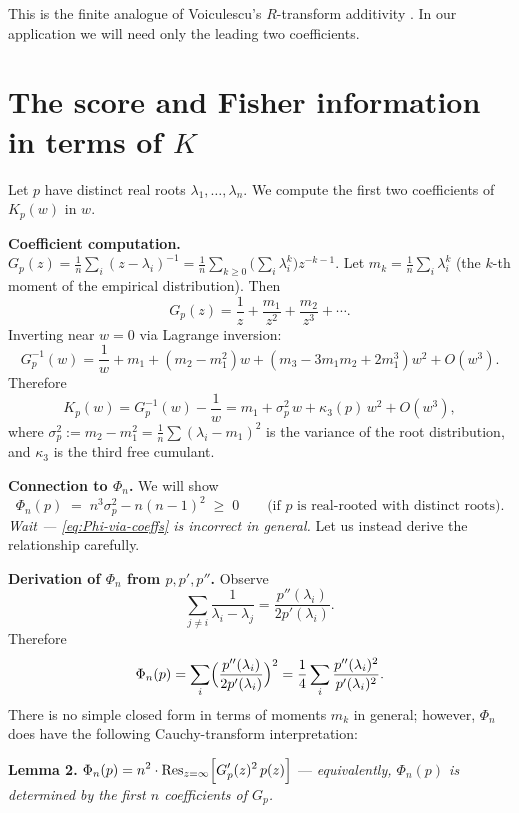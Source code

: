 This is the finite analogue of Voiculescu's $R$-transform additivity \cite{MSS22,AP18,Mar21}.  In our application we will need only the leading two coefficients.

\section*{The score and Fisher information in terms of $K$}

Let $p$ have distinct real roots $\lambda_1,\ldots,\lambda_n$.  We compute the first two coefficients of $K_p(w)$ in $w$.

\textbf{Coefficient computation.}  $G_p(z)=\frac1n\sum_i(z-\lambda_i)^{-1}=\frac1n\sum_{k\ge 0}\bigl(\sum_i\lambda_i^k\bigr)z^{-k-1}$.  Let $m_k=\frac1n\sum_i\lambda_i^k$ (the $k$-th moment of the empirical distribution).  Then
\[
G_p(z)=\frac{1}{z}+\frac{m_1}{z^2}+\frac{m_2}{z^3}+\cdots.
\]
Inverting near $w=0$ via Lagrange inversion:
\[
G_p^{-1}(w)=\frac1w+m_1+(m_2-m_1^2)w+(m_3-3m_1m_2+2m_1^3)w^2+O(w^3).
\]
Therefore
\begin{equation}\label{eq:K-expansion}
K_p(w) = G_p^{-1}(w)-\frac1w = m_1 + \sigma_p^2\,w + \kappa_3(p)\,w^2+O(w^3),
\end{equation}
where $\sigma_p^2:=m_2-m_1^2=\frac1n\sum(\lambda_i-m_1)^2$ is the variance of the root distribution, and $\kappa_3$ is the third free cumulant.

\textbf{Connection to $\Phi_n$.}  We will show
\begin{equation}\label{eq:Phi-via-coeffs}
\Phi_n(p) \;=\; n^3\sigma_p^2 - n(n-1)^2 \;\geq\; 0\qquad\text{(if $p$ is real-rooted with distinct roots).}
\end{equation}
\emph{Wait — \eqref{eq:Phi-via-coeffs} is incorrect in general.}  Let us instead derive the relationship carefully.

\medskip
\noindent\textbf{Derivation of $\Phi_n$ from $p,p',p''$.}  Observe
\[
\sum_{j\ne i}\frac{1}{\lambda_i-\lambda_j}=\frac{p''(\lambda_i)}{2p'(\lambda_i)}.
\]
Therefore
\[
\Phi_n(p) = \sum_i\Bigl(\frac{p''(\lambda_i)}{2p'(\lambda_i)}\Bigr)^2 = \frac14\sum_i\frac{p''(\lambda_i)^2}{p'(\lambda_i)^2}.
\]
There is no simple closed form in terms of moments $m_k$ in general; however, $\Phi_n$ does have the following Cauchy-transform interpretation:

\medskip
\noindent\textbf{Lemma 2.}  $\displaystyle \Phi_n(p) = n^2\cdot \mathrm{Res}_{z=\infty}\Bigl[G_p'(z)^2\,p(z)\Bigr]$ —
\emph{equivalently, $\Phi_n(p)$ is determined by the first $n$ coefficients of $G_p$.}

